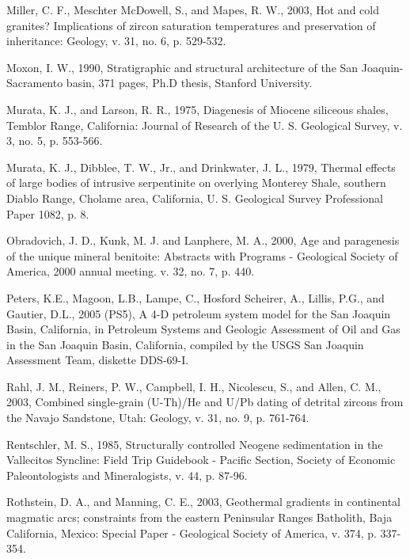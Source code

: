 \documentclass[11pt,twoside]{article}
\begin{document}
\begin{description}
\item Miller,  C. F., Meschter McDowell,  S., and Mapes,  R. W., 2003,
Hot and cold granites?  Implications of zircon saturation temperatures
and preservation of inheritance: Geology, v. 31, no. 6, p. 529-532.

\item Moxon, I. W., 1990, Stratigraphic and structural architecture of
the  San Joaquin-Sacramento  basin, 371  pages, Ph.D  thesis, Stanford
University.

\item Murata,  K. J., and Larson,  R. R., 1975,  Diagenesis of Miocene
siliceous shales,  Temblor Range,  California: Journal of  Research of
the U. S. Geological Survey, v. 3, no. 5, p. 553-566.

\item Murata, K. J., Dibblee, T. W., Jr., and Drinkwater, J. L., 1979,
Thermal effects of large bodies of intrusive serpentinite on overlying
Monterey  Shale,  southern  Diablo  Range, Cholame  area,  California,
U. S. Geological Survey Professional Paper 1082, p. 8.

\item Obradovich, J.  D., Kunk, M.  J. and Lanphere, M.  A., 2000, Age
and  paragenesis  of  the  unique mineral  benitoite:  Abstracts  with
Programs - Geological Society of  America, 2000 annual meeting. v. 32,
no. 7, p. 440.

\item  Peters, K.E., Magoon,  L.B., Lampe,  C., Hosford  Scheirer, A.,
Lillis, P.G.,  and Gautier, D.L.,  2005 (PS5), A 4-D  petroleum system
model for the San Joaquin  Basin, California, in Petroleum Systems and
Geologic  Assessment  of  Oil  and  Gas  in  the  San  Joaquin  Basin,
California, compiled by the USGS San Joaquin Assessment Team, diskette
DDS-69-I.

\item Rahl, J. M., Reiners, P. W., Campbell, I. H., Nicolescu, S., and
Allen, C. M., 2003, Combined single-grain (U-Th)/He and U/Pb dating of
detrital  zircons from  the Navajo  Sandstone, Utah:  Geology,  v. 31,
no. 9, p. 761-764.

\item  Rentschler,  M.   S.,  1985,  Structurally  controlled  Neogene
sedimentation  in  the Vallecitos  Syncline:  Field  Trip Guidebook  -
Pacific   Section,    Society   of   Economic    Paleontologists   and
Mineralogists, v. 44, p. 87-96.

\item Rothstein, D. A., and Manning, C. E., 2003, Geothermal gradients
in continental magmatic arcs;  constraints from the eastern Peninsular
Ranges Batholith, Baja California,  Mexico: Special Paper - Geological
Society of America, v. 374, p. 337-354.


\end{description}
\end{document}
